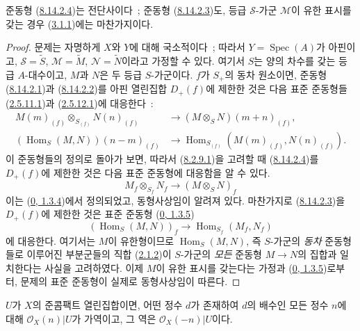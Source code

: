 \begin{proposition}[8.14.3]
\label{II.8.14.3-ko}
준동형 (\hyperref[II.8.14.2.4-ko]{8.14.2.4})는 전단사이다~; 준동형
(\hyperref[II.8.14.2.3-ko]{8.14.2.3})도, 등급 $\mathcal{S}$-가군
$\mathcal{M}$이 유한 표시를 갖는 경우
(\hyperref[II.3.1.1-ko]{3.1.1})에는 마찬가지이다.
\end{proposition}

\begin{proof}
문제는 자명하게 $X$와 $Y$에 대해 국소적이다~; 따라서
$Y=\operatorname{Spec}(A)$가 아핀이고, $\mathcal{S}=\widetilde{S}$,
$\mathcal{M}=\widetilde{M}$, $\mathcal{N}=\widetilde{N}$이라고 가정할 수
있다. 여기서 $S$는 양의 차수를 갖는 등급 $A$-대수이고, $M$과 $N$은
두 등급 $S$-가군이다. $f$가 $S_+$의 동차 원소이면, 준동형
(\hyperref[II.8.14.2.1-ko]{8.14.2.1})과
(\hyperref[II.8.14.2.2-ko]{8.14.2.2})를 아핀 열린집합 $D_+(f)$에
제한한 것은 다음 표준 준동형들
(\hyperref[II.2.5.11.1-ko]{2.5.11.1})과
(\hyperref[II.2.5.12.1-ko]{2.5.12.1})에 대응한다~:
\begin{align*}
  M(m)_{(f)}\otimes_{S_{(f)}}N(n)_{(f)}
  &\to(M\otimes_S N)(m+n)_{(f)},\\
  (\operatorname{Hom}_S(M,N))(n-m)_{(f)}
  &\to\operatorname{Hom}_{S_{(f)}}(M(m)_{(f)},N(n)_{(f)}).
\end{align*}
이 준동형들의 정의로 돌아가 보면, 따라서
(\hyperref[II.8.2.9.1-ko]{8.2.9.1})을 고려할 때
(\hyperref[II.8.14.2.4-ko]{8.14.2.4})를 $D_+(f)$에 제한한 것은
다음 표준 준동형에 대응함을 알 수 있다.
\[
  M_f\otimes_{S_f}N_f\to(M\otimes_S N)_f
\]
이는 (\hyperref[0.1.3.4-ko]{0, 1.3.4})에서 정의되었고, 동형사상임이
알려져 있다. 마찬가지로
(\hyperref[II.8.14.2.3-ko]{8.14.2.3})을 $D_+(f)$에 제한한 것은
표준 준동형 (\hyperref[0.1.3.5-ko]{0, 1.3.5})
\[
  (\operatorname{Hom}_S(M,N))_f\to
  \operatorname{Hom}_{S_f}(M_f,N_f)
\]
에 대응한다. 여기서는 $M$이 유한형이므로
$\operatorname{Hom}_S(M,N)$, 즉 $S$-가군의 \emph{동차} 준동형들로
이루어진 부분군들의 직합
(\hyperref[II.2.1.2-ko]{2.1.2})이 $S$-가군의 \emph{모든} 준동형
$M\to N$의 집합과 일치한다는 사실을 고려하였다. 이제 $M$이 유한
표시를 갖는다는 가정과 (\hyperref[0.1.3.5-ko]{0, 1.3.5})로부터, 문제의
표준 준동형이 실제로 동형사상임이 따른다.
\end{proof}

\begin{proposition}[8.14.4]
\label{II.8.14.4-ko}
$U$가 $X$의 준콤팩트 열린집합이면, 어떤 정수 $d$가 존재하여 $d$의
배수인 모든 정수 $n$에 대해 $\mathcal{O}_X(n)|U$가 가역이고, 그 역은
$\mathcal{O}_X(-n)|U$이다.
\end{proposition}

